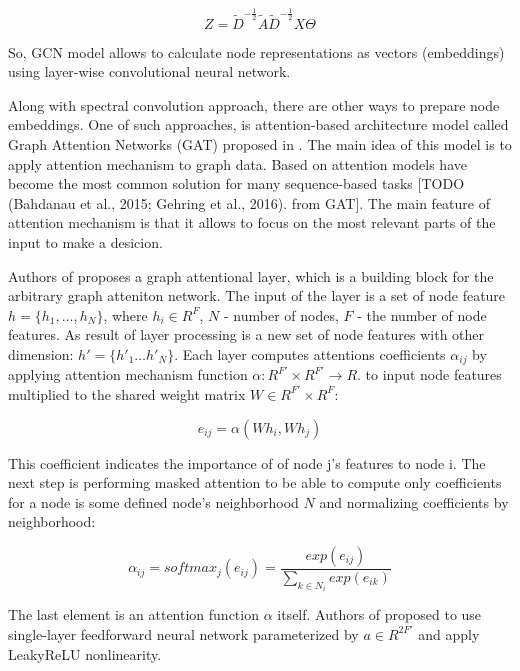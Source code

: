 \begin{equation}
    Z = \tilde{D}^{-\frac{1}{2}}\tilde{A}\tilde{D}^{-\frac{1}{2}}X\Theta
    \label{eq:FinalGCN}
\end{equation}

So, GCN model allows to calculate node representations as vectors (embeddings) using layer-wise convolutional neural network.


Along with spectral convolution approach, there are other ways to prepare node embeddings. One of such approaches, is 
attention-based architecture model called Graph Attention Networks (GAT) proposed in \cite{GAT}.
The main idea of this model is to apply attention mechanism to graph data. Based on attention models have become 
the most common solution for many sequence-based tasks [TODO (Bahdanau et al., 2015; Gehring et al., 2016). from GAT].
The main feature of attention mechanism is that it allows to focus on the most relevant parts of the input 
to make a desicion.

Authors of \cite{GAT} proposes a graph attentional layer, which is a building block for the arbitrary graph atteniton network.
The input of the layer is a set of node feature $ h=\{ h_1,\dots , h_N \}$, where $h_i \in R^F$, $N$ - number of nodes, $F$ - the number
of node features. As result of layer processing is a new set of node features with other dimension: $h' = \{ h'_1 \dots h'_N \}$.
Each layer computes attentions coefficients $\alpha_{ij}$ by applying attention mechanism function $\alpha : R^{F'} \times R^{F'} \rightarrow R$.
to input node features multiplied to the shared weight matrix $W \in R^{F'} \times R^{F}$:

\begin{equation}
    e_{ij} = \alpha(Wh_i, Wh_j)
    \label{eq:att_coeff}
\end{equation}

This coefficient indicates the importance of of node j's features to node i. The next step is performing masked attention to 
be able to compute only coefficients for a node is some defined node's neighborhood $N$ and normalizing coefficients by neighborhood:


\begin{equation}
   \alpha_{ij} = softmax_j(e_{ij}) = \frac{exp(e_{ij})}{\sum_{k \in N_i}exp(e_{ik})}
\end{equation}

The last element is an attention function $\alpha$ itself. Authors of \cite{GAT} proposed to use
single-layer feedforward neural network parameterized by $a \in R^{2F'}$ and apply LeakyReLU nonlinearity.

